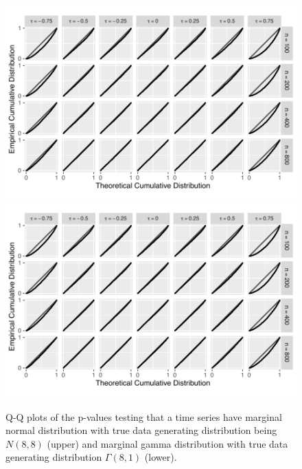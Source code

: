 \documentclass[APA,Times1COL]{WileyNJDv5} %
\begin{document}
\begin{figure}[tbp]
  \centering
  \includegraphics[width = .9\textwidth]{figures/normal.png}
  \includegraphics[width = .9\textwidth]{figures/gamma.png}
  \caption{Q-Q plots of the p-values testing that a time series
    have marginal normal distribution with true data generating distribution
    being $N(8,8)$ (upper) and marginal gamma distribution with true data
    generating distribution $\Gamma(8,1)$ (lower).}
  \label{fig:qq}
\end{figure}
\end{document}
